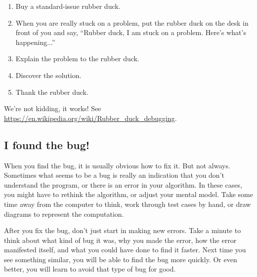 \documentclass[12pt]{book}
\theoremstyle{exercise}
\begin{document}

\begin{enumerate}

\item Buy a standard-issue rubber duck.

\item When you are really stuck on a problem, put the rubber duck on the desk in front of you and say, ``Rubber duck, I am stuck on a problem.
Here's what's happening...''

\item Explain the problem to the rubber duck.

\item Discover the solution.

\item Thank the rubber duck.

\end{enumerate}

We're not kidding, it works!
See \url{https://en.wikipedia.org/wiki/Rubber_duck_debugging}.


\subsection*{I found the bug!}

When you find the bug, it is usually obvious how to fix it.
But not always.
Sometimes what seems to be a bug is really an indication that you don't understand the program, or there is an error in your algorithm.
In these cases, you might have to rethink the algorithm, or adjust your mental model.
Take some time away from the computer to think, work through test cases by hand, or draw diagrams to represent the computation.

After you fix the bug, don't just start in making new errors.
Take a minute to think about what kind of bug it was, why you made the error, how the error manifested itself, and what you could have done to find it faster.
Next time you see something similar, you will be able to find the bug more quickly.
Or even better, you will learn to avoid that type of bug for good.


\backmatter
\printindex

\end{document}
